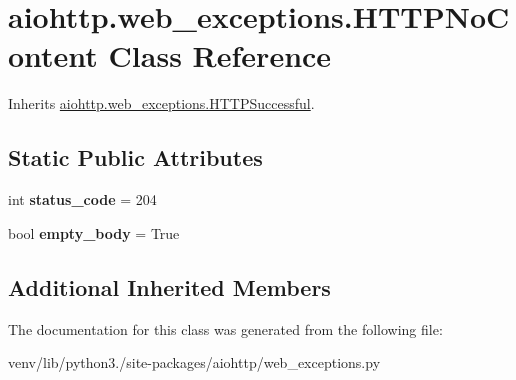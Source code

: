 \hypertarget{classaiohttp_1_1web__exceptions_1_1_h_t_t_p_no_content}{}\section{aiohttp.\+web\+\_\+exceptions.\+H\+T\+T\+P\+No\+Content Class Reference}
\label{classaiohttp_1_1web__exceptions_1_1_h_t_t_p_no_content}


Inherits \hyperlink{classaiohttp_1_1web__exceptions_1_1_h_t_t_p_successful}{aiohttp.\+web\+\_\+exceptions.\+H\+T\+T\+P\+Successful}.

\subsection*{Static Public Attributes}
\begin{DoxyCompactItemize}
\item 
\mbox{\label{classaiohttp_1_1web__exceptions_1_1_h_t_t_p_no_content_a4e2b86056271a0a8376dc63c99e5f3d2}} 
int {\bfseries status\+\_\+code} = 204
\item 
\mbox{\label{classaiohttp_1_1web__exceptions_1_1_h_t_t_p_no_content_af17fd96332598b116d97810f6e8c8616}} 
bool {\bfseries empty\+\_\+body} = True
\end{DoxyCompactItemize}
\subsection*{Additional Inherited Members}


The documentation for this class was generated from the following file\+:\begin{DoxyCompactItemize}
\item 
venv/lib/python3./site-\/packages/aiohttp/web\+\_\+exceptions.\+py\end{DoxyCompactItemize}
